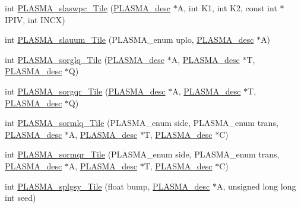 \begin{DoxyCompactItemize}
\item 
int \hyperlink{group__float__Tile_ga765f714264c08f2c497aae9d3a989e29_ga765f714264c08f2c497aae9d3a989e29}{P\+L\+A\+S\+M\+A\+\_\+slaswpc\+\_\+\+Tile} (\hyperlink{structplasma__desc__t}{P\+L\+A\+S\+M\+A\+\_\+desc} $\ast$A, int K1, int K2, const int $\ast$I\+P\+I\+V, int I\+N\+C\+X)
\item 
int \hyperlink{group__float__Tile_ga746291d04f29d541feed78901a0350ee_ga746291d04f29d541feed78901a0350ee}{P\+L\+A\+S\+M\+A\+\_\+slauum\+\_\+\+Tile} (P\+L\+A\+S\+M\+A\+\_\+enum uplo, \hyperlink{structplasma__desc__t}{P\+L\+A\+S\+M\+A\+\_\+desc} $\ast$A)
\item 
int \hyperlink{group__float__Tile_gae62c41d7980dbddbd3b0554ac186f4eb_gae62c41d7980dbddbd3b0554ac186f4eb}{P\+L\+A\+S\+M\+A\+\_\+sorglq\+\_\+\+Tile} (\hyperlink{structplasma__desc__t}{P\+L\+A\+S\+M\+A\+\_\+desc} $\ast$A, \hyperlink{structplasma__desc__t}{P\+L\+A\+S\+M\+A\+\_\+desc} $\ast$T, \hyperlink{structplasma__desc__t}{P\+L\+A\+S\+M\+A\+\_\+desc} $\ast$Q)
\item 
int \hyperlink{group__float__Tile_gaec88819afb466ae7e88a1743915aebac_gaec88819afb466ae7e88a1743915aebac}{P\+L\+A\+S\+M\+A\+\_\+sorgqr\+\_\+\+Tile} (\hyperlink{structplasma__desc__t}{P\+L\+A\+S\+M\+A\+\_\+desc} $\ast$A, \hyperlink{structplasma__desc__t}{P\+L\+A\+S\+M\+A\+\_\+desc} $\ast$T, \hyperlink{structplasma__desc__t}{P\+L\+A\+S\+M\+A\+\_\+desc} $\ast$Q)
\item 
int \hyperlink{group__float__Tile_ga8033d8163163f2681562008e5f4a3ccb_ga8033d8163163f2681562008e5f4a3ccb}{P\+L\+A\+S\+M\+A\+\_\+sormlq\+\_\+\+Tile} (P\+L\+A\+S\+M\+A\+\_\+enum side, P\+L\+A\+S\+M\+A\+\_\+enum trans, \hyperlink{structplasma__desc__t}{P\+L\+A\+S\+M\+A\+\_\+desc} $\ast$A, \hyperlink{structplasma__desc__t}{P\+L\+A\+S\+M\+A\+\_\+desc} $\ast$T, \hyperlink{structplasma__desc__t}{P\+L\+A\+S\+M\+A\+\_\+desc} $\ast$C)
\item 
int \hyperlink{group__float__Tile_ga3fdeed46ef1d25052ce1535bfd40c07e_ga3fdeed46ef1d25052ce1535bfd40c07e}{P\+L\+A\+S\+M\+A\+\_\+sormqr\+\_\+\+Tile} (P\+L\+A\+S\+M\+A\+\_\+enum side, P\+L\+A\+S\+M\+A\+\_\+enum trans, \hyperlink{structplasma__desc__t}{P\+L\+A\+S\+M\+A\+\_\+desc} $\ast$A, \hyperlink{structplasma__desc__t}{P\+L\+A\+S\+M\+A\+\_\+desc} $\ast$T, \hyperlink{structplasma__desc__t}{P\+L\+A\+S\+M\+A\+\_\+desc} $\ast$C)
\item 
int \hyperlink{group__float__Tile_gaf848b57db71b77ac83f655c925a9c1ce_gaf848b57db71b77ac83f655c925a9c1ce}{P\+L\+A\+S\+M\+A\+\_\+splgsy\+\_\+\+Tile} (float bump, \hyperlink{structplasma__desc__t}{P\+L\+A\+S\+M\+A\+\_\+desc} $\ast$A, unsigned long long int seed)

\end{DoxyCompactItemize}
